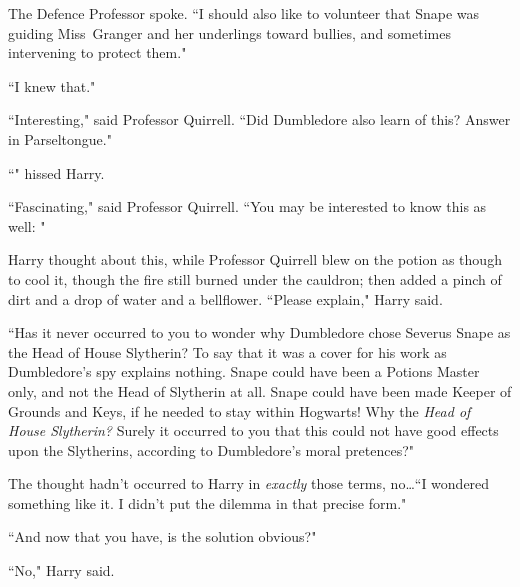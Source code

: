 The Defence Professor spoke. ``I should also like to volunteer that Snape was guiding Miss~Granger and her underlings toward bullies, and sometimes intervening to protect them."

``I knew that."

``Interesting," said Professor Quirrell. ``Did Dumbledore also learn of this? Answer in Parseltongue."

``" hissed Harry.

``Fascinating," said Professor Quirrell. ``You may be interested to know this as well: "

Harry thought about this, while Professor Quirrell blew on the potion as though to cool it, though the fire still burned under the cauldron; then added a pinch of dirt and a drop of water and a bellflower. ``Please explain," Harry said.

``Has it never occurred to you to wonder why Dumbledore chose Severus Snape as the Head of House Slytherin? To say that it was a cover for his work as Dumbledore's spy explains nothing. Snape could have been a Potions Master only, and not the Head of Slytherin at all. Snape could have been made Keeper of Grounds and Keys, if he needed to stay within Hogwarts! Why the \emph{Head of House Slytherin?} Surely it occurred to you that this could not have good effects upon the Slytherins, according to Dumbledore's moral pretences?"

The thought hadn't occurred to Harry in \emph{exactly} those terms, no…``I wondered something like it. I didn't put the dilemma in that precise form."

``And now that you have, is the solution obvious?"

``No," Harry said.


